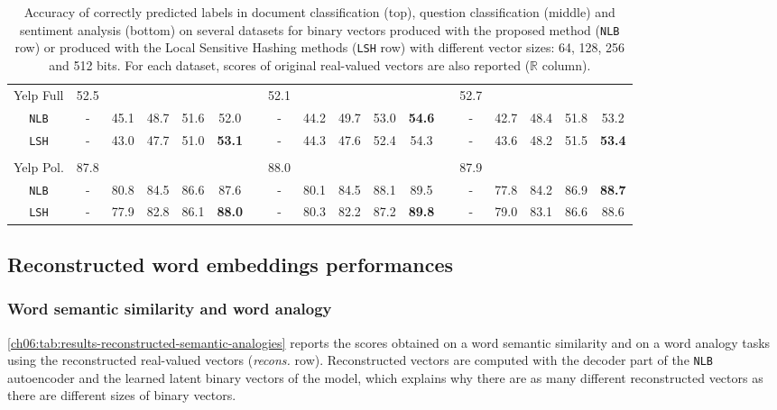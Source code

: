 \begin{table}[h]
{\begin{tabular}{@{}lcccccrcccccrccccc@{}}
            Yelp Full & 52.5 &&&&&& 52.1 &&&&&& 52.7\\
              \multicolumn{1}{c}{\texttt{NLB}}
                &-& 45.1 & 48.7 & 51.6 & 52.0 &
                &-& 44.2 & 49.7 & 53.0 & \textbf{54.6} &
                &-& 42.7 & 48.4 & 51.8 & 53.2\\
              \multicolumn{1}{c}{\texttt{LSH}}
                &-& 43.0 & 47.7 & 51.0 & \textbf{53.1} &
                &-& 44.3 & 47.6 & 52.4 & 54.3 &
                &-& 43.6 & 48.2 & 51.5 & \textbf{53.4}\\\\
            Yelp Pol. & 87.8 &&&&&& 88.0 &&&&&& 87.9\\
              \multicolumn{1}{c}{\texttt{NLB}}
                &-& 80.8 & 84.5 & 86.6 & 87.6 &
                &-& 80.1 & 84.5 & 88.1 & 89.5 &
                &-& 77.8 & 84.2 & 86.9 & \textbf{88.7}\\
              \multicolumn{1}{c}{\texttt{LSH}}
                &-& 77.9 & 82.8 & 86.1 & \textbf{88.0} &
                &-& 80.3 & 82.2 & 87.2 & \textbf{89.8} &
                &-& 79.0 & 83.1 & 86.6 & 88.6\\
          \bottomrule[0.15em]
        \end{tabular}}
        \caption[Evaluation of binary and real-valued vectors on text
        classification tasks.] {Accuracy of correctly predicted labels in
        document classification (top), question classification (middle) and
        sentiment analysis (bottom) on several datasets for binary vectors
        produced with the proposed method (\texttt{NLB} row) or produced with
        the Local Sensitive Hashing methods (\texttt{LSH} row) with different
        vector sizes: 64, 128, 256 and 512 bits. For each dataset, scores of
        original real-valued vectors are also reported ($\mathbb{R}$ column).}
        \label{ch06:tab:results-binary-classification}
      \end{table}

  \subsection{Reconstructed word embeddings performances}
    \label{ch06:subsec:performances-reconstructed}
    \subsubsection{Word semantic similarity and word analogy}
      \label{ch06:subsubsec:results-reconstructed-intrinsic}
      \autoref{ch06:tab:results-reconstructed-semantic-analogies} reports the
      scores obtained on a word semantic similarity and on a word analogy tasks
      using the reconstructed real-valued vectors (\textit{recons.} row).
      Reconstructed vectors are computed with the decoder part of the
      \texttt{NLB} autoencoder and the learned latent binary vectors of the
      model, which explains why there are as many different reconstructed
      vectors as there are different sizes of binary vectors. \medskip

